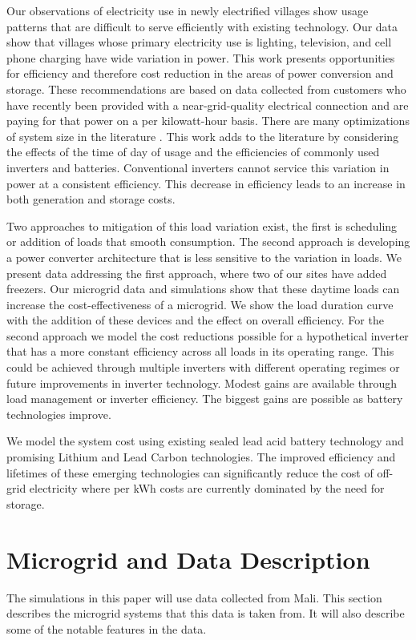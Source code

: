 \documentclass[conference]{IEEEtran}
\begin{document}
Our observations of electricity use in newly electrified villages
show usage patterns that are difficult to serve efficiently 
with existing technology.
Our data show that villages whose primary electricity use is 
lighting, television, and cell phone charging have wide variation
in power.
This work presents opportunities for efficiency and therefore
cost reduction in the areas of power conversion and storage.
These recommendations are based on data collected from customers
who have recently been provided with a near-grid-quality
electrical connection and are paying for that power on a
per kilowatt-hour basis.
There are many optimizations of system size in the literature
\cite{optimizations}.
This work adds to the literature by considering the effects
of the time of day of usage and the efficiencies of commonly
used inverters and batteries.
Conventional inverters cannot service this variation in power
at a consistent efficiency.
This decrease in efficiency leads to an increase in both
generation and storage costs.

Two approaches to mitigation of this load variation exist, 
the first is scheduling or addition of loads that smooth consumption.
The second approach is developing a power converter architecture
that is less sensitive to the variation in loads.
We present data addressing the first approach, where two of our 
sites have added freezers.
Our microgrid data and simulations show that these daytime loads
can increase the cost-effectiveness of a microgrid.
We show the load duration curve with the addition of these 
devices and the effect on overall efficiency.
For the second approach we model the cost reductions possible
for a hypothetical inverter that has a more constant efficiency
across all loads in its operating range.
This could be achieved through multiple inverters with 
different operating regimes or future improvements in inverter
technology.
Modest gains are available through load management or 
inverter efficiency.
The biggest gains are possible as battery technologies improve.

We model the system cost using existing sealed lead acid 
battery technology and promising Lithium and Lead Carbon
technologies.
The improved efficiency and lifetimes of these emerging technologies
can significantly reduce the cost of off-grid electricity
where per kWh costs are currently dominated by the need
for storage.


\section{Microgrid and Data Description}
The simulations in this paper will use data collected from 
Mali.
This section describes the microgrid systems that this data
is taken from.
It will also describe some of the notable features in the data.
\end{document}
